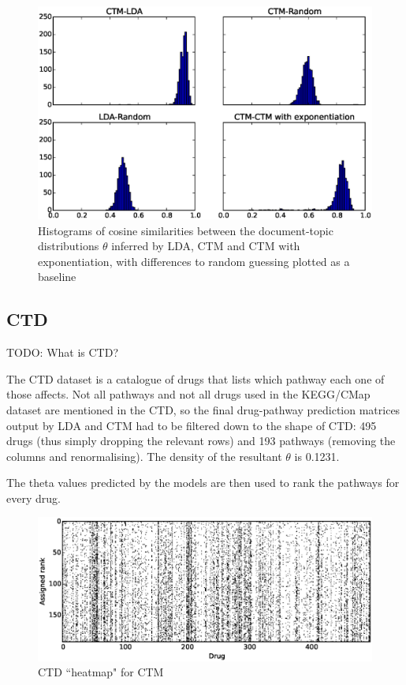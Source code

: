 \documentclass[12pt,a4paper,twoside,openright]{report}
\begin{document}
\begin{figure}[!htb]
\includegraphics[width=\textwidth]{ctd-ctm-lda-diffs.eps}
\caption{Histograms of cosine similarities between the document-topic distributions $\theta$ inferred by LDA, CTM and CTM with exponentiation, with differences to random guessing plotted as a baseline}
\label{fig:ctd-ctm-lda-diffs}
\end{figure}

\subsection{CTD}

TODO: What is CTD?

The CTD dataset is a catalogue of drugs that lists which pathway each one of those affects. Not all pathways and not all drugs used in the KEGG/CMap dataset are mentioned in the CTD, so the final drug-pathway prediction matrices output by LDA and CTM had to be filtered down to the shape of CTD: 495 drugs (thus simply dropping the relevant rows) and 193 pathways (removing the columns and renormalising). The density of the resultant $\theta$ is 0.1231.

The theta values predicted by the models are then used to rank the pathways for every drug.

\begin{figure}[!htb]
\includegraphics[width=\textwidth]{ctm-ctd-heatmap.eps}
\caption{CTD ``heatmap" for CTM}
\label{fig:ctm-ctd-heatmap}
\end{figure}
\end{document}
